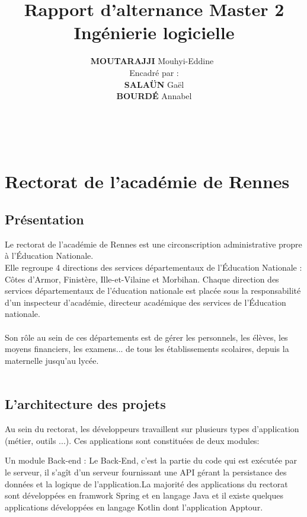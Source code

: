 \documentclass[a4paper]{article}
\title{\textbf{Rapport d'alternance Master 2 Ingénierie logicielle\\ }}
\author{\textbf{MOUTARAJJI} Mouhyi-Eddine\
\\Encadré par :\\\textbf{SALAÜN} Gaël \\\textbf{BOURDÉ} Annabel }
\begin{document}
\date{}




\maketitle

\newpage

\tableofcontents
~
\newpage



\section{Rectorat de l’académie de Rennes} 

\subsection{Présentation}

Le rectorat de l'académie de Rennes est une circonscription administrative propre à
l’Éducation Nationale.\\
Elle regroupe 4 directions des services départementaux de l'Éducation Nationale : 
Côtes d'Armor, Finistère, Ille-et-Vilaine et Morbihan. Chaque direction des services départementaux de l'éducation nationale est placée sous la responsabilité d'un inspecteur d'académie, directeur académique des services de l'Éducation nationale.\\\\
Son rôle au sein de ces départements est de gérer les personnels, les élèves, les moyens financiers, les examens... de tous les établissements scolaires, depuis la maternelle jusqu'au lycée.\\\\

\subsection{L'architecture des projets}

Au sein du rectorat, les développeurs travaillent sur plusieurs types d'application (métier, outils ...). Ces applications sont constituées de deux modules: 

Un module Back-end : Le Back-End, c’est la partie du code qui est exécutée par le serveur, il s’agît d'un serveur fournissant une API gérant la persistance des données et la logique de l'application.La majorité des applications du rectorat sont développées en framwork Spring et en langage Java et il existe quelques applications développées en langage Kotlin dont l'application Apptour.
\end{document}
